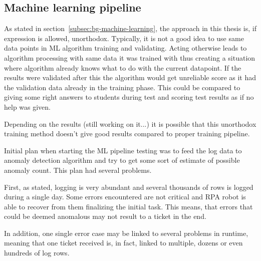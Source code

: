



\subsection{Machine learning pipeline}\label{subsec:meth-ml-pipeline}

As stated in section~\ref{subsec:bg-machine-learning},
the approach in this thesis is,
if expression is allowed, unorthodox.
Typically,
it is not a good idea to use
same data points in ML algorithm training and validating.
Acting otherwise
leads to algorithm processing with
same data it was trained with
thus creating a situation
where algorithm already knows what to do with the current datapoint.
If the results were validated after this
the algorithm would get unreliable score
as it had the validation data already in the training phase.
This could be compared to
giving some right answers to students
during test and scoring test results as if
no help was given.


\begin{itcomment}
    Depending on the results (still working on it...)
    it is possible that this unorthodox training method doesn't give good results
    compared to proper training pipeline.
\end{itcomment}

Initial plan when starting the ML pipeline testing
was to feed the log data to anomaly detection algorithm
and try to get some sort of estimate of possible anomaly count.
This plan had several problems.

First, as stated, logging is very abundant
and several thousands of rows is logged
during a single day.
Some errors encountered are not critical
and RPA robot is able to recover from them
finalizing the initial task.
This means, that errors that could be deemed anomalous
may not result to a ticket in the end.

In addition,
one single error case
may be linked to several problems in runtime,
meaning that one ticket received is,
in fact, linked to multiple, dozens or
even hundreds of log rows.

